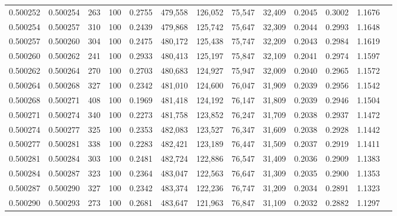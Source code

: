 \begin{tabular}{rrrrrrrrrrrrr}
0.500252 & 0.500254 &   263 & 100 &                                     0.2755 & 479,558 & 126,052 &  75,547 &  32,409 & 0.2045 & 0.3002 & 1.1676 \\
0.500254 & 0.500257 &   310 & 100 &                                     0.2439 & 479,868 & 125,742 &  75,647 &  32,309 & 0.2044 & 0.2993 & 1.1648 \\
0.500257 & 0.500260 &   304 & 100 &                                     0.2475 & 480,172 & 125,438 &  75,747 &  32,209 & 0.2043 & 0.2984 & 1.1619 \\
0.500260 & 0.500262 &   241 & 100 &                                     0.2933 & 480,413 & 125,197 &  75,847 &  32,109 & 0.2041 & 0.2974 & 1.1597 \\
0.500262 & 0.500264 &   270 & 100 &                                     0.2703 & 480,683 & 124,927 &  75,947 &  32,009 & 0.2040 & 0.2965 & 1.1572 \\
0.500264 & 0.500268 &   327 & 100 &                                     0.2342 & 481,010 & 124,600 &  76,047 &  31,909 & 0.2039 & 0.2956 & 1.1542 \\
0.500268 & 0.500271 &   408 & 100 &                                     0.1969 & 481,418 & 124,192 &  76,147 &  31,809 & 0.2039 & 0.2946 & 1.1504 \\
0.500271 & 0.500274 &   340 & 100 &                                     0.2273 & 481,758 & 123,852 &  76,247 &  31,709 & 0.2038 & 0.2937 & 1.1472 \\
0.500274 & 0.500277 &   325 & 100 &                                     0.2353 & 482,083 & 123,527 &  76,347 &  31,609 & 0.2038 & 0.2928 & 1.1442 \\
0.500277 & 0.500281 &   338 & 100 &                                     0.2283 & 482,421 & 123,189 &  76,447 &  31,509 & 0.2037 & 0.2919 & 1.1411 \\
0.500281 & 0.500284 &   303 & 100 &                                     0.2481 & 482,724 & 122,886 &  76,547 &  31,409 & 0.2036 & 0.2909 & 1.1383 \\
0.500284 & 0.500287 &   323 & 100 &                                     0.2364 & 483,047 & 122,563 &  76,647 &  31,309 & 0.2035 & 0.2900 & 1.1353 \\
0.500287 & 0.500290 &   327 & 100 &                                     0.2342 & 483,374 & 122,236 &  76,747 &  31,209 & 0.2034 & 0.2891 & 1.1323 \\
0.500290 & 0.500293 &   273 & 100 &                                     0.2681 & 483,647 & 121,963 &  76,847 &  31,109 & 0.2032 & 0.2882 & 1.1297 \\

\end{tabular}
